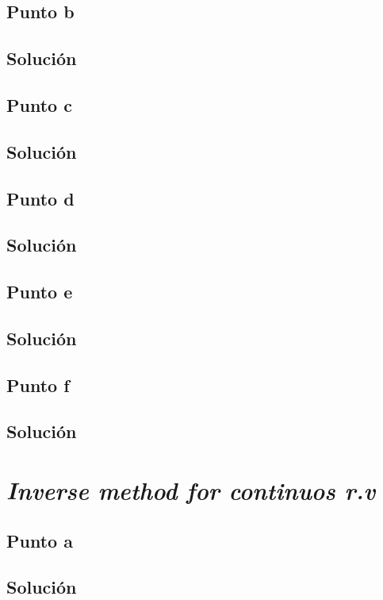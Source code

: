 \documentclass[12pt]{article}
\begin{document}
\subsection{Punto b}
\subsection{Solución}

\subsection{Punto c}
\subsection{Solución}

\subsection{Punto d}
\subsection{Solución}

\subsection{Punto e}
\subsection{Solución}

\subsection{Punto f}
\subsection{Solución}


\section{\textit{Inverse method for continuos r.v}}

\subsection{Punto a}
\subsection{Solución}
\end{document}
